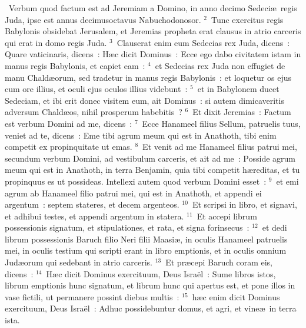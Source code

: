 ~\lettrine[lines=10,image=true,loversize=0.05,lraise=-0.03]{V}{}erbum quod factum est ad Jeremiam a Domino, in anno decimo Sedeci\ae\ regis Juda, ipse est annus decimusoctavus Nabuchodonosor.
${}^{2}$~Tunc exercitus regis Babylonis obsidebat Jerusalem, et Jeremias propheta erat clausus in atrio carceris qui erat in domo regis Juda.
${}^{3}$~Clauserat enim eum Sedecias rex Juda, dicens~: Quare vaticinaris, dicens~: H\ae c dicit Dominus~: Ecce ego dabo civitatem istam in manus regis Babylonis, et capiet eam~:
${}^{4}$~et Sedecias rex Juda non effugiet de manu Chald\ae orum, sed tradetur in manus regis Babylonis~: et loquetur os ejus cum ore illius, et oculi ejus oculos illius videbunt~:
${}^{5}$~et in Babylonem ducet Sedeciam, et ibi erit donec visitem eum, ait Dominus~: si autem dimicaveritis adversum Chald\ae os, nihil prosperum habebitis~?
${}^{6}$~Et dixit Jeremias~: Factum est verbum Domini ad me, dicens~:
${}^{7}$~Ecce Hanameel filius Sellum, patruelis tuus, veniet ad te, dicens~: Eme tibi agrum meum qui est in Anathoth, tibi enim competit ex propinquitate ut emas.
${}^{8}$~Et venit ad me Hanameel filius patrui mei, secundum verbum Domini, ad vestibulum carceris, et ait ad me~: Posside agrum meum qui est in Anathoth, in terra Benjamin, quia tibi competit h\ae reditas, et tu propinquus es ut possideas. Intellexi autem quod verbum Domini esset~:
${}^{9}$~et emi agrum ab Hanameel filio patrui mei, qui est in Anathoth, et appendi ei argentum~: septem stateres, et decem argenteos.
${}^{10}$~Et scripsi in libro, et signavi, et adhibui testes, et appendi argentum in statera.
${}^{11}$~Et accepi librum possessionis signatum, et stipulationes, et rata, et signa forinsecus~:
${}^{12}$~et dedi librum possessionis Baruch filio Neri filii Maasi\ae , in oculis Hanameel patruelis mei, in oculis testium qui scripti erant in libro emptionis, et in oculis omnium Jud\ae orum qui sedebant in atrio carceris.
${}^{13}$~Et pr\ae cepi Baruch coram eis, dicens~:
${}^{14}$~H\ae c dicit Dominus exercituum, Deus Isra\"el~: Sume libros istos, librum emptionis hunc signatum, et librum hunc qui apertus est, et pone illos in vase fictili, ut permanere possint diebus multis~:
${}^{15}$~h\ae c enim dicit Dominus exercituum, Deus Isra\"el~: Adhuc possidebuntur domus, et agri, et vine\ae\ in terra ista.



